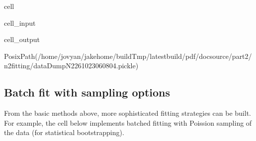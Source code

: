 \documentclass[letterpaper,table,10pt,english]{jupyterBook}
\begin{document}
\begin{sphinxuseclass}{cell}\begin{sphinxVerbatimInput}

\begin{sphinxuseclass}{cell_input}
\begin{sphinxVerbatim}[commandchars=\\\{\}]
    


     
\end{sphinxVerbatim}

\end{sphinxuseclass}\end{sphinxVerbatimInput}
\begin{sphinxVerbatimOutput}

\begin{sphinxuseclass}{cell_output}
\begin{sphinxVerbatim}[commandchars=\\\{\}]
PosixPath(\PYGZsq{}/home/jovyan/jake\PYGZhy{}home/buildTmp/\PYGZus{}latest\PYGZus{}build/pdf/doc\PYGZhy{}source/part2/n2fitting/dataDump\PYGZus{}N2\PYGZus{}261023\PYGZus{}06\PYGZhy{}08\PYGZhy{}04.pickle\PYGZsq{})
\end{sphinxVerbatim}

\end{sphinxuseclass}\end{sphinxVerbatimOutput}

\end{sphinxuseclass}

\subsection{Batch fit with sampling options}
\label{\detokenize{part2/basic_fitting_numerics_intro_260723:batch-fit-with-sampling-options}}
\sphinxAtStartPar
From the basic methods above, more sophisticated fitting strategies can be built. For example, the cell below implements batched fitting with Poission sampling of the data (for statistical bootstrapping).
\end{document}
